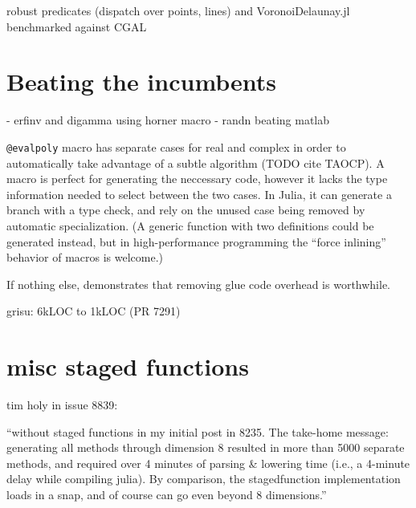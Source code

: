 robust predicates (dispatch over points, lines) and VoronoiDelaunay.jl
benchmarked against CGAL


\section{Beating the incumbents}

- erfinv and digamma using horner macro
- randn beating matlab

\texttt{@evalpoly} macro has separate cases for real and complex in order to
automatically take advantage of a subtle algorithm (TODO cite TAOCP).
A macro is perfect for generating the neccessary code, however it lacks
the type information needed to select between the two cases.
In Julia, it can generate a branch with a type check, and rely on the
unused case being removed by automatic specialization. (A generic
function with two definitions could be generated instead, but in
high-performance programming the ``force inlining'' behavior of macros
is welcome.)

If nothing else, demonstrates that removing glue code overhead is worthwhile.

grisu: 6kLOC to 1kLOC (PR 7291)


\section{misc staged functions}

tim holy in issue 8839:

``without staged functions in my initial post in 8235. The take-home message: generating all methods through dimension 8 resulted in more than 5000 separate methods, and required over 4 minutes of parsing \& lowering time (i.e., a 4-minute delay while compiling julia). By comparison, the stagedfunction implementation loads in a snap, and of course can go even beyond 8 dimensions.''




